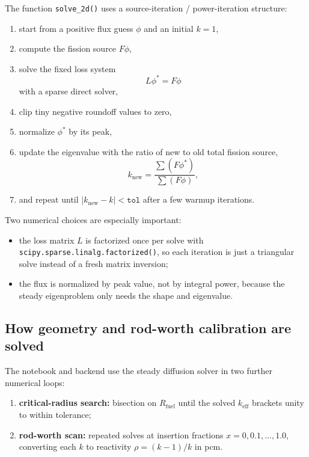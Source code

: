 \documentclass[11pt]{article}
\begin{document}
The function \texttt{solve\_2d()} uses a source-iteration / power-iteration
structure:
\begin{enumerate}
  \item start from a positive flux guess $\phi$ and an initial $k=1$,
  \item compute the fission source $F\phi$,
  \item solve the fixed loss system
        \[
        L\phi^{*} = F\phi
        \]
        with a sparse direct solver,
  \item clip tiny negative roundoff values to zero,
  \item normalize $\phi^{*}$ by its peak,
  \item update the eigenvalue with the ratio of new to old total fission source,
        \[
        k_{\mathrm{new}} = \frac{\sum(F\phi^{*})}{\sum(F\phi)},
        \]
  \item and repeat until $|k_{\mathrm{new}}-k| < \texttt{tol}$ after a few warmup
        iterations.
\end{enumerate}

Two numerical choices are especially important:
\begin{itemize}
  \item the loss matrix $L$ is factorized once per solve with
        \texttt{scipy.sparse.linalg.factorized()}, so each iteration is just a
        triangular solve instead of a fresh matrix inversion;
  \item the flux is normalized by peak value, not by integral power, because the
        steady eigenproblem only needs the shape and eigenvalue.
\end{itemize}

\subsection{How geometry and rod-worth calibration are solved}

The notebook and backend use the steady diffusion solver in two further numerical
loops:
\begin{enumerate}
  \item \textbf{critical-radius search:} bisection on $R_{\mathrm{fuel}}$ until
        the solved $k_{\mathrm{eff}}$ brackets unity to within tolerance;
  \item \textbf{rod-worth scan:} repeated solves at insertion fractions
        $x=0,0.1,\dots,1.0$, converting each $k$ to reactivity
        $\rho = (k-1)/k$ in pcm.
\end{enumerate}
\end{document}
